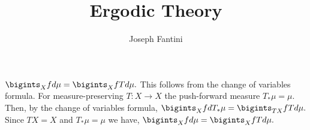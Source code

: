\documentclass{article}
\title{Ergodic Theory}
\author{Joseph Fantini}
\begin{document}
\maketitle

$\bigints_X fd\mu = \bigints_X fTd\mu.$
This follows from the change of variables formula. For measure-preserving $T: X \rightarrow X$ the push-forward measure $T_*\mu = \mu$. Then, by the change of variables formula,
$\bigints_X fdT_*\mu = \bigints_{TX} fTd\mu.$ Since $TX = X$ and $T_*\mu = \mu$ we have,
$\bigints_X fd\mu = \bigints_{X} fTd\mu.$
\end{document}
